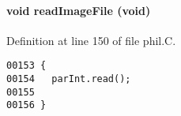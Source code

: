 \paragraph{\setlength{\rightskip}{0pt plus 5cm}void read\-Image\-File (void)}\hfill



Definition at line 150 of file phil.C.\small\begin{verbatim}00153 {
00154   parInt.read();
00155 
00156 }
\end{verbatim}\normalsize 
